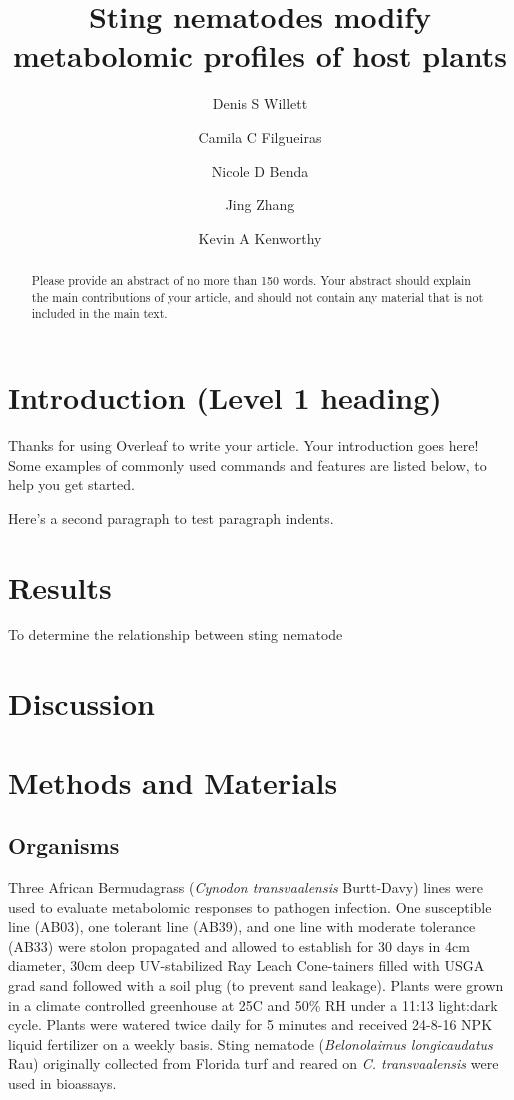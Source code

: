 \documentclass[9pt,lineno]{elife}
\title{Sting nematodes modify metabolomic profiles of host plants}
\author[1*,\authfn{1}]{Denis S Willett}
\author[1,\authfn{1}]{Camila C Filgueiras}
\author[2]{Nicole D Benda}
\author[2]{Jing Zhang}
\author[3]{Kevin A Kenworthy}
\affil[1]{Applied Chemical Ecology Technology, Department of Entomology, Cornell AgriTech}
\affil[2]{Entomology and Nemotalogy Department, University of Florida}
\affil[3]{Agronomy Department, University of Florida}
\begin{document}
\maketitle

\begin{abstract}
Please provide an abstract of no more than 150 words. Your abstract should explain the main contributions of your article, and should not contain any material that is not included in the main text.
\end{abstract}


\section{Introduction (Level 1 heading)}

Thanks for using Overleaf to write your article. Your introduction goes here! Some examples of commonly used commands and features are listed below, to help you get started.

Here's a second paragraph to test paragraph indents. \lipsum[1]

\section{Results}

To determine the relationship between sting nematode 



\section{Discussion}


\section{Methods and Materials}


\subsection{Organisms}

Three African Bermudagrass (\textit{Cynodon transvaalensis} Burtt-Davy) lines were used to evaluate metabolomic responses to pathogen infection.  One susceptible line (AB03), one tolerant line (AB39), and one line with moderate tolerance (AB33) were stolon propagated and allowed to establish for 30 days in 4cm diameter, 30cm deep UV-stabilized Ray Leach Cone-tainers filled with USGA grad sand followed with a soil plug (to prevent sand leakage). Plants were grown in a climate controlled greenhouse at 25C and 50\% RH under a 11:13 light:dark cycle.  Plants were watered twice daily for 5 minutes and received 24-8-16 NPK liquid fertilizer on a weekly basis.  Sting nematode (\textit{Belonolaimus longicaudatus} Rau) originally collected from Florida turf and reared on \textit{C. transvaalensis} were used in bioassays. 
\end{document}

